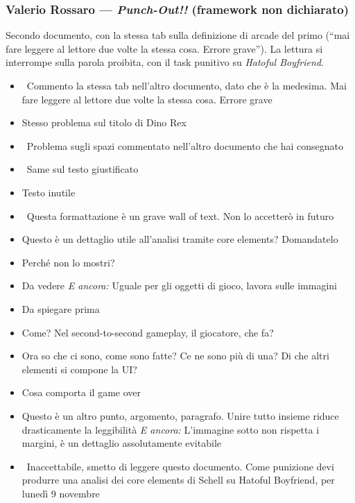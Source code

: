 \subsubsection{Valerio Rossaro --- \emph{Punch-Out!!} (framework non
dichiarato)}
Secondo documento, con la stessa tab sulla definizione di arcade del primo
(``mai fare leggere al lettore due volte la stessa cosa. Errore grave''). La
lettura si interrompe sulla parola proibita, con il task punitivo su
\emph{Hatoful Boyfriend}.
{\small
\begin{itemize}
  \item {} \rvAvviso\ Commento la stessa tab nell'altro documento, dato che è la medesima. Mai fare leggere al lettore due volte la stessa cosa. Errore grave
  \item {} Stesso problema sul titolo di Dino Rex
  \item \rvVuoto\ Problema sugli spazi commentato nell'altro documento che hai consegnato
  \item \rvVuoto\ Same sul testo giustificato
  \item {} Testo inutile
  \item {} \rvAvviso\ Questa formattazione è un grave wall of text. Non lo accetterò in futuro
  \item {} Questo è un dettaglio utile all'analisi tramite core elements? Domandatelo
  \item {} Perché non lo mostri?
  \item {} Da vedere \emph{E ancora:} Uguale per gli oggetti di gioco, lavora sulle immagini
  \item {} Da spiegare prima
  \item {} Come? Nel second-to-second gameplay, il giocatore, che fa?
  \item {} Ora so che ci sono, come sono fatte? Ce ne sono più di una? Di che altri elementi si compone la UI?
  \item {} Cosa comporta il game over
  \item {} Questo è un altro punto, argomento, paragrafo. Unire tutto insieme riduce drasticamente la leggibilità \emph{E ancora:} L'immagine sotto non rispetta i margini, è un dettaglio assolutamente evitabile
  \item {} \rvAvviso\ Inaccettabile, smetto di leggere questo documento. Come punizione devi produrre una analisi dei core elements di Schell su Hatoful Boyfriend, per lunedì 9 novembre
\end{itemize}
}

